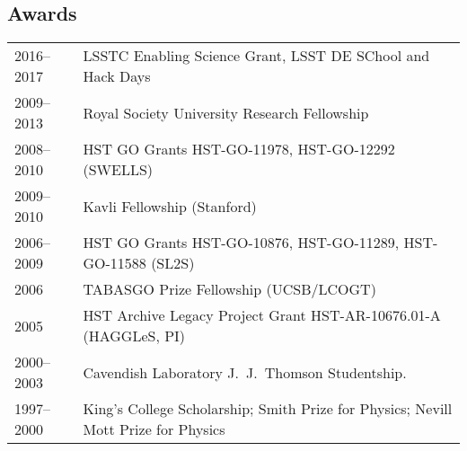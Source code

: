 \subsection*{Awards}

\begin{tabular}{@{}p{2.5cm}p{15.5cm}}
2016--2017  & LSSTC Enabling Science Grant, LSST DE SChool and Hack Days \\
2009--2013  & Royal Society University Research Fellowship \\
2008--2010  & HST GO Grants HST-GO-11978, HST-GO-12292 (SWELLS)\\
2009--2010  & Kavli Fellowship (Stanford) \\
2006--2009  & HST GO Grants HST-GO-10876, HST-GO-11289, HST-GO-11588 (SL2S)\\
2006        & TABASGO Prize Fellowship (UCSB/LCOGT) \\
2005        & HST Archive Legacy Project Grant HST-AR-10676.01-A (HAGGLeS, PI)\\
2000--2003  & Cavendish Laboratory J.\ J.\ Thomson Studentship.\\
1997--2000  & King's College Scholarship; Smith Prize for Physics; Nevill Mott Prize for Physics
\end{tabular}
